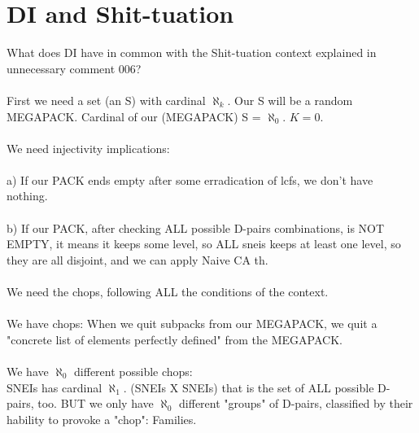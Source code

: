 \chapter{DI and Shit-tuation}

	\noindent
	What does DI have in common with the Shit-tuation context explained in unnecessary comment 006?
	\\\\
	
	\noindent
	First we need a set (an S) with cardinal $\aleph_{k}$. Our S will be a random MEGAPACK. Cardinal of our (MEGAPACK) S  = $\aleph_{0}$. $K = 0$.
	\\\\
	
	\noindent
	We need injectivity implications:\\\\
	a) If our PACK ends empty after some erradication of lcfs, we don't have nothing.\\\\
	b) If our PACK, after checking ALL possible D-pairs combinations, is NOT EMPTY, it means it keeps some level, so ALL sneis keeps at least one level, so they are all disjoint, and we can apply Naive CA th.
	\\\\
	
	\noindent
	We need the chops, following ALL the conditions of the context.
	\\\\
	
	\noindent
	We have chops: When we quit subpacks from our MEGAPACK, we quit a "concrete list of elements perfectly defined" from the MEGAPACK.
	\\\\
	
	\noindent
	We have $\aleph_{0}$ different possible chops:\\
	SNEIs has cardinal $\aleph_{1}$. (SNEIs X SNEIs) that is the set of ALL possible D-pairs, too. BUT we only have $\aleph_{0}$ different "groups" of D-pairs, classified by their hability to provoke a "chop": Families.
	\\\\
	

